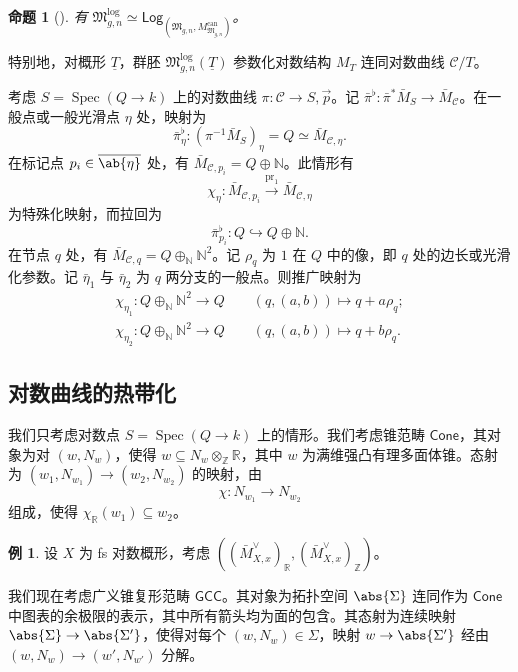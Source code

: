 \documentclass{amsart}
\newtheorem{prop}[thm]{命题}
\theoremstyle{definition}
\newtheorem{exm}[thm]{例}
\theoremstyle{remark}
\theoremstyle{plain}
\theoremstyle{definition}
\theoremstyle{remark}
\newcommand{\N}{\mathbb{N}}
\newcommand{\R}{\mathbb{R}}
\newcommand{\Z}{\mathbb{Z}}
\newcommand{\mc}[1]{\mathcal{#1}}
\newcommand{\mf}[1]{\mathfrak{#1}}
\newcommand{\on}[1]{\operatorname{#1}}
\newcommand{\ms}[1]{\mathsf{#1}}
\newcommand{\ol}[1]{\overline{#1}}
\newcommand{\ul}[1]{\underline{#1}}
\newcommand{\1}{\mathbf{1}}
\newcommand{\2}{\mathbf{2}}
\newcommand{\3}{\mathbf{3}}
\DeclareMathOperator{\Spec}{Spec}
\begin{document}
\begin{prop}[{\cite{FKato2000,Olsson2003}}]
    有 \(\mf{M}_{g,n}^{\log} \simeq \ms{Log}_{(\mf{M}_{g,n}, M_{\mf{M}_{g,n}}^{\on{can}})}\)。
\end{prop}

特别地，对概形 \(\ul{T}\)，群胚 \(\mf{M}_{g,n}^{\log}(\ul{T})\) 参数化对数结构 \(M_T\) 连同对数曲线 \(\mc{C} / T\)。

考虑 \(S = \Spec (Q \to k)\) 上的对数曲线 \(\pi \colon \mc{C} \to S, \vec{p}\)。记 \(\bar{\pi}^{\flat} \colon \bar{\pi}^* \bar{M}_S \to \bar{M}_{\mc{C}}\)。在一般点或一般光滑点 \(\eta\) 处，映射为
\[ \bar{\pi}_{\eta}^{\flat} \colon (\pi^{-1} \bar{M}_S)_{\eta} = Q \simeq \bar{M}_{\mc{C}, \eta}. \]
在标记点 \(p_i \in \ol{\ab\{\eta\}}\) 处，有 \(\bar{M}_{\mc{C}, p_i} = Q \oplus \N\)。此情形有
\[ \chi_{\eta} \colon \bar{M}_{\mc{C}, p_i} \xrightarrow{\on{pr}_1} \bar{M}_{\mc{C}, \eta} \]
为特殊化映射，而拉回为
\[ \bar{\pi}_{p_i}^{\flat} \colon Q \hookrightarrow Q \oplus \N. \]
在节点 \(q\) 处，有 \(\bar{M}_{\mc{C}, q} = Q \oplus_{\N} \N^2\)。记 \(\rho_q\) 为 \(1\) 在 \(Q\) 中的像，即 \(q\) 处的边长或光滑化参数。记 \(\bar{\eta}_1\) 与 \(\bar{\eta}_2\) 为 \(q\) 两分支的一般点。则推广映射为
\begin{align*}
    \chi_{\eta_1} \colon Q \oplus_{\N} \N^2 \to Q \qquad (q, (a,b)) \mapsto q + a \rho_q ;\\
    \chi_{\eta_2} \colon Q \oplus_{\N} \N^2 \to Q \qquad (q, (a,b)) \mapsto q + b \rho_q .
\end{align*}

\subsection{对数曲线的热带化}%
\label{sub:Tropicalization of log curves}

我们只考虑对数点 \(S = \Spec(Q \to k)\) 上的情形。我们考虑锥范畴 \(\ms{Cone}\)，其对象为对 \((w, N_w)\)，使得 \(w \subseteq N_w \otimes_{\Z} \R\)，其中 \(w\) 为满维强凸有理多面体锥。态射为 \((w_1, N_{w_1}) \to (w_2, N_{w_2})\) 的映射，由
\[ \chi \colon N_{w_1} \to N_{w_2} \]
组成，使得 \(\chi_{\R}(w_1) \subseteq w_2\)。

\begin{exm}
    设 \(X\) 为 fs 对数概形，考虑 \(( (\bar{M}_{X,x}^{\vee})_{\R}, (\bar{M}_{X,x}^{\vee})_{\Z} )\)。
\end{exm}

我们现在考虑广义锥复形范畴 \(\ms{GCC}\)。其对象为拓扑空间 \(\abs{\Sigma}\) 连同作为 \(\ms{Cone}\) 中图表的余极限的表示，其中所有箭头均为面的包含。其态射为连续映射 \(\abs{\Sigma} \to \abs{\Sigma'}\)，使得对每个 \((w, N_w) \in \Sigma\)，映射 \(w \to \abs{\Sigma'}\) 经由 \((w, N_w) \to (w', N_{w'})\) 分解。
\end{document}
